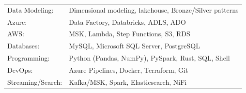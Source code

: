 \documentclass[]{deedy-resume-openfont}
\begin{document}
\begin{minipage}[t]{0.66\textwidth}
\begin{tabular}{ l l }
Data Modeling: & Dimensional modeling, lakehouse, Bronze/Silver patterns \\
Azure: & Data Factory, Databricks, ADLS, ADO \\
AWS: &  MSK, Lambda, Step Functions, S3, RDS \\
Databases: & MySQL, Microsoft SQL Server, PostgreSQL \\
Programming: & Python (Pandas, NumPy), PySpark, Rust, SQL, Shell \\
DevOps: & Azure Pipelines, Docker, Terraform, Git \\
Streaming/Search: & Kafka/MSK, Spark, Elasticsearch, NiFi \\


\end{tabular}
\sectionsep


\end{minipage} 
\end{document}
